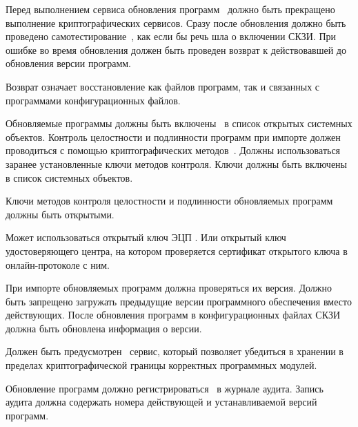 \label{R.SU.Logic}
Перед выполнением сервиса обновления программ~ 
должно быть прекращено выполнение криптографических сервисов. 
%
Сразу после обновления должно быть проведено 
самотестирование~, 
как если бы речь шла о включении СКЗИ.
%
При ошибке во время обновления должен быть проведен
возврат к действовавшей до обновления версии программ. 

\begin{note}
Возврат означает восстановление как файлов программ, так и связанных с 
программами конфигурационных файлов. 
\end{note}

\label{R.SU.Import}
Обновляемые программы должны быть включены~ в список
открытых системных объектов. Контроль целостности и подлинности программ при
импорте должен проводиться с помощью криптографических
методов~. Должны использоваться заранее установленные ключи
методов контроля. Ключи должны быть включены~ в список
системных объектов.

\label{R.SU.Sig}
Ключи методов контроля целостности и подлинности обновляемых программ должны 
быть открытыми. 

\begin{note}
Может использоваться открытый ключ ЭЦП . Или открытый 
ключ удостоверяющего центра, на котором проверяется сертификат открытого ключа 
 в онлайн-протоколе с ним. 
\end{note}

\label{R.SU.Version}
При импорте обновляемых программ должна проверяться их версия.
Должно быть запрещено загружать предыдущие версии программного обеспечения 
вместо действующих. После обновления программ в конфигурационных файлах СКЗИ
должна быть обновлена информация о версии.

\label{R.SU.PoS}
Должен быть предусмотрен~ сервис, 
который позволяет убедиться в хранении в пределах криптографической границы
корректных программных модулей.

\label{R.SU.AU}
Обновление программ должно регистрироваться~ в 
журнале аудита. 
%
Запись аудита должна содержать номера действующей и устанавливаемой версий 
программ.

